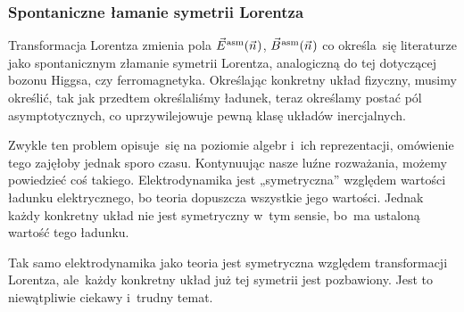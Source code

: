 \documentclass[10pt,t]{beamer}
\begin{document}
\begin{frame}
  \frametitle{Spontaniczne łamanie symetrii Lorentza}


  Transformacja Lorentza zmienia pola $\vec{E}^{ \hspace{0.05em} \text{asm} }( \vec{n} \hspace{0.05em} )$, $\vec{B}^{ \hspace{0.05em} \text{asm} }( \vec{n} \hspace{0.05em} )$ co określa~się
  literaturze jako spontanicznym złamanie symetrii Lorentza, analogiczną do
  tej dotyczącej bozonu Higgsa, czy ferromagnetyka. Określając konkretny
  układ fizyczny, musimy określić, tak jak przedtem określaliśmy ładunek,
  teraz określamy postać pól asymptotycznych, co uprzywilejowuje pewną klasę
  układów inercjalnych.

  Zwykle ten problem opisuje~się na poziomie algebr i~ich reprezentacji,
  omówienie tego zajęłoby jednak sporo czasu. Kontynuując nasze luźne
  rozważania, możemy powiedzieć coś takiego. Elektrodynamika jest
  „symetryczna” względem wartości ładunku elektrycznego, bo teoria dopuszcza
  wszystkie jego wartości. Jednak każdy konkretny \alert{układ} nie jest
  symetryczny w~tym sensie, bo~ma ustaloną wartość tego ładunku.

  Tak samo elektrodynamika jako teoria jest symetryczna względem
  transformacji Lorentza, ale~każdy konkretny układ już tej symetrii jest
  pozbawiony. Jest to niewątpliwie ciekawy i~trudny temat.

\end{frame}
\end{document}
